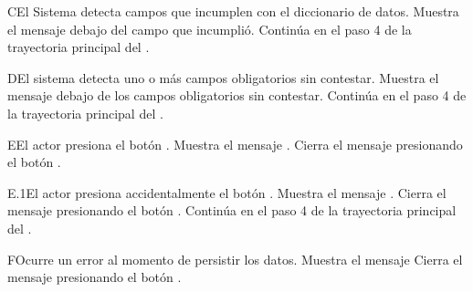 \begin{UCtrayectoriaA}{C}{El Sistema detecta campos que incumplen con el diccionario de datos.}
    \UCpaso Muestra el mensaje  debajo del campo que incumplió.
    \UCpaso Continúa en el paso 4 de la trayectoria principal del .
\end{UCtrayectoriaA}
\begin{UCtrayectoriaA}{D}{El sistema detecta uno o más campos obligatorios sin contestar.}
    \UCpaso Muestra el mensaje  debajo de los campos obligatorios sin contestar.
    \UCpaso Continúa en el paso 4 de la trayectoria principal del .
\end{UCtrayectoriaA}
\begin{UCtrayectoriaA}{E}{El actor presiona el botón .}
    \UCpaso Muestra el mensaje .
    \UCpaso[\UCactor] Cierra el mensaje presionando el botón .
\end{UCtrayectoriaA}
\begin{UCtrayectoriaA}{E.1}{El actor presiona accidentalmente el botón .}
    \UCpaso Muestra el mensaje .
    \UCpaso[\UCactor] Cierra el mensaje presionando el botón .
    \UCpaso Continúa en el paso 4 de la trayectoria principal del .
\end{UCtrayectoriaA}
\begin{UCtrayectoriaA}{F}{Ocurre un error al momento de persistir los datos.}
    \UCpaso Muestra el mensaje 
    \UCpaso[\UCactor] Cierra el mensaje presionando el botón .
\end{UCtrayectoriaA}
